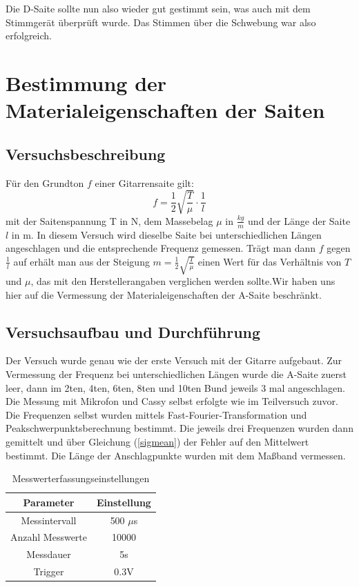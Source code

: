 \documentclass[12pt,a4paper]{article}
\begin{document}
Die D-Saite sollte nun also wieder gut gestimmt sein, was auch mit dem Stimmgerät überprüft wurde. Das Stimmen über die Schwebung war also erfolgreich.

\section{Bestimmung der Materialeigenschaften der Saiten}
\subsection{Versuchsbeschreibung}
Für den Grundton $f$ einer Gitarrensaite gilt:
\begin{equation}
f=\frac{1}{2}\sqrt{\frac{T}{\mu}}\cdot \frac{1}{l}
\label{Grundgleichung Gitarre f gegen l}
\end{equation}
mit der Saitenspannung T in N, dem Massebelag $\mu$ in $\frac{kg}{m}$ und der Länge der Saite $l$ in m.
In diesem Versuch wird dieselbe Saite bei unterschiedlichen Längen angeschlagen und die entsprechende Frequenz gemessen. Trägt man dann $f$ gegen $\frac{1}{l}$ auf erhält man aus der Steigung $m=\frac{1}{2}\sqrt{\frac{T}{\mu}}$ einen Wert für das Verhältnis von $T$ und $\mu$, das mit den Herstellerangaben verglichen werden sollte.\newline Wir haben uns hier auf die Vermessung der Materialeigenschaften der A-Saite beschränkt.

\subsection{Versuchsaufbau und Durchführung}
Der Versuch wurde genau wie der erste Versuch mit der Gitarre aufgebaut. \newline
Zur Vermessung der Frequenz bei unterschiedlichen Längen wurde die A-Saite zuerst leer, dann im 2ten, 4ten, 6ten, 8ten und 10ten Bund jeweils 3 mal angeschlagen. Die Messung mit Mikrofon und Cassy selbst erfolgte wie im Teilversuch zuvor.
Die Frequenzen selbst wurden mittels Fast-Fourier-Transformation und Peakschwerpunktsberechnung bestimmt. Die jeweils drei Frequenzen wurden dann gemittelt und über Gleichung (\ref{sigmean}) der Fehler auf den Mittelwert bestimmt.
\newline
Die Länge der Anschlagpunkte wurden mit dem Maßband vermessen.\newline

\begin{table}[H]\centering
\caption{Messwerterfassungseinstellungen}
\begin{tabular}{c|c}
Parameter & Einstellung \\ 
\hline
Messintervall & 500 $\mu$s \\ 
Anzahl Messwerte & 10000 \\ 
Messdauer & 5s \\ 
Trigger & 0.3V \\ 
\end{tabular} 
\end{table}
\end{document}
